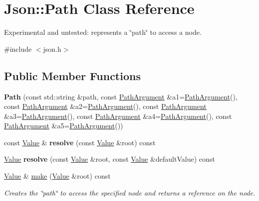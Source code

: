 \hypertarget{class_json_1_1_path}{\section{Json\-:\-:Path Class Reference}
\label{class_json_1_1_path}
}


Experimental and untested\-: represents a \char`\"{}path\char`\"{} to access a node.  




{\ttfamily \#include $<$json.\-h$>$}

\subsection*{Public Member Functions}
\begin{DoxyCompactItemize}
\item 
\hypertarget{class_json_1_1_path_aaa37a99650e770d0cd680bf53585ec99}{{\bfseries Path} (const std\-::string \&path, const \hyperlink{class_json_1_1_path_argument}{Path\-Argument} \&a1=\hyperlink{class_json_1_1_path_argument}{Path\-Argument}(), const \hyperlink{class_json_1_1_path_argument}{Path\-Argument} \&a2=\hyperlink{class_json_1_1_path_argument}{Path\-Argument}(), const \hyperlink{class_json_1_1_path_argument}{Path\-Argument} \&a3=\hyperlink{class_json_1_1_path_argument}{Path\-Argument}(), const \hyperlink{class_json_1_1_path_argument}{Path\-Argument} \&a4=\hyperlink{class_json_1_1_path_argument}{Path\-Argument}(), const \hyperlink{class_json_1_1_path_argument}{Path\-Argument} \&a5=\hyperlink{class_json_1_1_path_argument}{Path\-Argument}())}\label{class_json_1_1_path_aaa37a99650e770d0cd680bf53585ec99}

\item 
\hypertarget{class_json_1_1_path_ae1d05fa985a6ee3c57f2b8ed186b5982}{const \hyperlink{class_json_1_1_value}{Value} \& {\bfseries resolve} (const \hyperlink{class_json_1_1_value}{Value} \&root) const }\label{class_json_1_1_path_ae1d05fa985a6ee3c57f2b8ed186b5982}

\item 
\hypertarget{class_json_1_1_path_a33d1749770a4cf74e9a3de419bc7febe}{\hyperlink{class_json_1_1_value}{Value} {\bfseries resolve} (const \hyperlink{class_json_1_1_value}{Value} \&root, const \hyperlink{class_json_1_1_value}{Value} \&default\-Value) const }\label{class_json_1_1_path_a33d1749770a4cf74e9a3de419bc7febe}

\item 
\hypertarget{class_json_1_1_path_a5289901fc58ad1fdca1de7fb5a0b620c}{\hyperlink{class_json_1_1_value}{Value} \& \hyperlink{class_json_1_1_path_a5289901fc58ad1fdca1de7fb5a0b620c}{make} (\hyperlink{class_json_1_1_value}{Value} \&root) const }\label{class_json_1_1_path_a5289901fc58ad1fdca1de7fb5a0b620c}

\begin{DoxyCompactList}\small\item\em Creates the \char`\"{}path\char`\"{} to access the specified node and returns a reference on the node. \end{DoxyCompactList}\end{DoxyCompactItemize}
